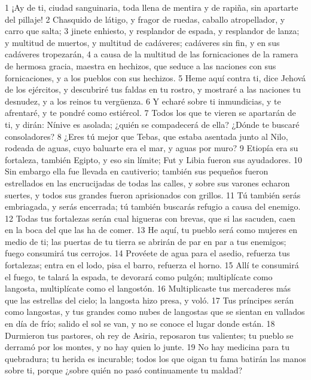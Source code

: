 1 ¡Ay de ti, ciudad sanguinaria, toda llena de mentira y de rapiña, sin apartarte del pillaje!
2 Chasquido de látigo, y fragor de ruedas, caballo atropellador, y carro que salta;
3 jinete enhiesto, y resplandor de espada, y resplandor de lanza; y multitud de muertos, y multitud de cadáveres; cadáveres sin fin, y en sus cadáveres tropezarán,
4 a causa de la multitud de las fornicaciones de la ramera de hermosa gracia, maestra en hechizos, que seduce a las naciones con sus fornicaciones, y a los pueblos con sus hechizos.
5 Heme aquí contra ti, dice Jehová de los ejércitos, y descubriré tus faldas en tu rostro, y mostraré a las naciones tu desnudez, y a los reinos tu vergüenza.
6 Y echaré sobre ti inmundicias, y te afrentaré, y te pondré como estiércol.
7 Todos los que te vieren se apartarán de ti, y dirán: Nínive es asolada; ¿quién se compadecerá de ella? ¿Dónde te buscaré consoladores?
8 ¿Eres tú mejor que Tebas, que estaba asentada junto al Nilo, rodeada de aguas, cuyo baluarte era el mar, y aguas por muro?
9 Etiopía era su fortaleza, también Egipto, y eso sin límite; Fut y Libia fueron sus ayudadores.
10 Sin embargo ella fue llevada en cautiverio; también sus pequeños fueron estrellados en las encrucijadas de todas las calles, y sobre sus varones echaron suertes, y todos sus grandes fueron aprisionados con grillos.
11 Tú también serás embriagada, y serás encerrada; tú también buscarás refugio a causa del enemigo.
12 Todas tus fortalezas serán cual higueras con brevas, que si las sacuden, caen en la boca del que las ha de comer.
13 He aquí, tu pueblo será como mujeres en medio de ti; las puertas de tu tierra se abrirán de par en par a tus enemigos; fuego consumirá tus cerrojos.
14 Provéete de agua para el asedio, refuerza tus fortalezas; entra en el lodo, pisa el barro, refuerza el horno.
15 Allí te consumirá el fuego, te talará la espada, te devorará como pulgón; multiplícate como langosta, multiplícate como el langostón.
16 Multiplicaste tus mercaderes más que las estrellas del cielo; la langosta hizo presa, y voló.
17 Tus príncipes serán como langostas, y tus grandes como nubes de langostas que se sientan en vallados en día de frío; salido el sol se van, y no se conoce el lugar donde están.
18 Durmieron tus pastores, oh rey de Asiria, reposaron tus valientes; tu pueblo se derramó por los montes, y no hay quien lo junte.
19 No hay medicina para tu quebradura; tu herida es incurable; todos los que oigan tu fama batirán las manos sobre ti, porque ¿sobre quién no pasó continuamente tu maldad?

